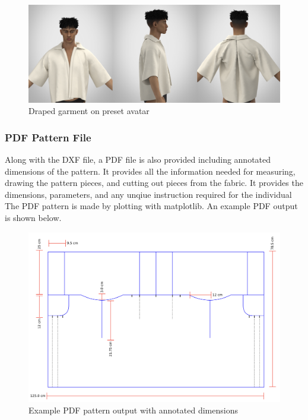 \begin{figure} [H]
    \centering
    \includegraphics[width = \textwidth]{Images/first render.PNG}
    \caption{Draped garment on preset avatar}
    \label{fig:render}
\end{figure}

\subsubsection{PDF Pattern File}
Along with the DXF file, a PDF file is also provided including annotated dimensions of the pattern. It provides all the information needed for measuring, drawing the pattern pieces, and cutting out pieces from the fabric. It provides the dimensions, parameters, and any unqiue instruction required for the individual The PDF pattern is made by plotting with matplotlib. An example PDF output is shown below.
\begin{figure} [H]
    \centering
    \includegraphics[width = \textwidth]{Images/example pdf output.png}
    \caption{Example PDF pattern output with annotated dimensions}
    \label{fig:pdf output}
\end{figure}

